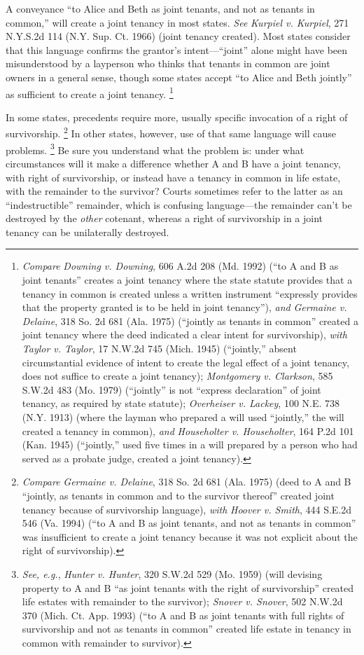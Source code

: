 A conveyance ``to Alice and Beth as joint tenants, and not as tenants in
common,'' will create a joint tenancy in most states. \textit{See} \emph{Kurpiel
v. Kurpiel}, 271 N.Y.S.2d 114 (N.Y. Sup. Ct. 1966) (joint tenancy created). Most
states consider that this language confirms the grantor's intent---``joint''
alone might have been misunderstood by a layperson who thinks that tenants in
common are joint owners in a general sense, though some states accept ``to Alice
and Beth jointly'' as sufficient to create a joint tenancy.
\footnote{\textit{Compare}
\emph{Downing v. Downing}, 606 A.2d 208 (Md. 1992) (``to A and B as joint
tenants'' creates a joint tenancy where the state statute provides that a
tenancy in common is created unless a written instrument ``expressly provides
that the property granted is to be held in joint tenancy''), \textit{and}
\emph{Germaine v. Delaine}, 318 So. 2d 681 (Ala. 1975) (``jointly as tenants in
common'' created a joint tenancy where the deed indicated a clear intent for
survivorship), \textit{with} \emph{Taylor v. Taylor}, 17 N.W.2d 745 (Mich. 1945)
(``jointly,'' absent circumstantial evidence of intent to create the legal
effect of a joint tenancy, does not suffice to create a joint tenancy);
\emph{Montgomery v. Clarkson}, 585 S.W.2d 483 (Mo. 1979) (``jointly'' is not
``express declaration'' of joint tenancy, as required by state statute);
\emph{Overheiser v. Lackey}, 100 N.E. 738 (N.Y. 1913) (where the layman who
prepared a will used ``jointly,'' the will created a tenancy in common),
\textit{and} \emph{Householter v. Householter}, 164 P.2d 101 (Kan. 1945)
(``jointly,'' used five times in a will prepared by a person who had served as a
probate judge, created a joint tenancy).}

In some states, precedents require more, usually specific invocation of a right
of survivorship. \footnote{\textit{Compare} \emph{Germaine v. Delaine}, 318 So.
2d 681 (Ala. 1975) (deed to A and B ``jointly, as tenants in common and to the
survivor thereof'' created joint tenancy because of survivorship language),
\textit{with} \emph{Hoover v. Smith}, 444 S.E.2d 546 (Va. 1994) (``to A and B as
joint tenants, and not as tenants in common'' was insufficient to create a joint
tenancy because it was not explicit about the right of survivorship).}
In other states, however, use of that same language will cause problems.
\footnote{\textit{See, e.g.}, \emph{Hunter v. Hunter}, 320 S.W.2d 529 (Mo. 1959)
(will devising property to A and B ``as joint tenants with the right of
survivorship'' created life estates with remainder to the survivor);
\emph{Snover v. Snover}, 502 N.W.2d 370 (Mich. Ct. App. 1993) (``to A and B as
joint tenants with full rights of survivorship and not as tenants in common''
created life estate in tenancy in common with remainder to survivor).} Be sure
you understand what the problem is: under what circumstances will it make a
difference whether A and B have a joint tenancy, with right of survivorship, or
instead have a tenancy in common in life estate, with the remainder to the
survivor? Courts sometimes refer to the latter as an ``indestructible''
remainder, which is confusing language---the remainder can't be destroyed by the
\textit{other} cotenant, whereas a right of survivorship in a joint tenancy can
be unilaterally destroyed.

